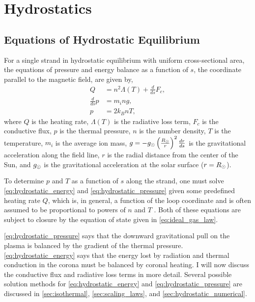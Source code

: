 \section{Hydrostatics}\label{sec:hydrostatic}

\subsection{Equations of Hydrostatic Equilibrium}\label{sec:hydrostatic_equations}

For a single strand in hydrostatic equilibrium with uniform cross-sectional area, the equations of pressure and energy balance as a function of $s$, the coordinate parallel to the magnetic field, are given by,
\begin{align}
    Q &= n^2\Lambda(T) + \frac{d}{ds}F_c, \label{eq:hydrostatic_energy} \\
    \frac{d}{ds}p &= m_ing, \label{eq:hydrostatic_pressure} \\
    p &= 2k_BnT, \label{eq:ideal_gas_law}
\end{align}
where $Q$ is the heating rate, $\Lambda(T)$ is the radiative loss term, $F_c$ is the conductive flux, $p$ is the thermal pressure, $n$ is the number density, $T$ is the temperature, $m_i$ is the average ion mass, $g=-g_\odot\left(\frac{R_\odot}{r}\right)^2\frac{dr}{ds}$ is the gravitational acceleration along the field line, $r$ is the radial distance from the center of the Sun, and $g_\odot$ is the gravitational acceleration at the solar surface ($r=R_\odot$).

To determine $p$ and $T$ as a function of $s$ along the strand, one must solve \autoref{eq:hydrostatic_energy} and \autoref{eq:hydrostatic_pressure} given some predefined heating rate $Q$, which is, in general, a function of the loop coordinate and is often assumed to be proportional to powers of $n$ and $T$ \citep{priest_magnetohydrodynamics_2014}. Both of these equations are subject to closure by the equation of state given in \autoref{eq:ideal_gas_law}.

\autoref{eq:hydrostatic_pressure} says that the downward gravitational pull on the plasma is balanced by the gradient of the thermal pressure. \autoref{eq:hydrostatic_energy} says that the energy lost by radiation and thermal conduction in the corona must be balanced by coronal heating. I will now discuss the conductive flux and radiative loss terms in more detail. Several possible solution methods for \autoref{eq:hydrostatic_energy} and \autoref{eq:hydrostatic_pressure} are discussed in \autoref{sec:isothermal}, \ref{sec:scaling_laws}, and \ref{sec:hydrostatic_numerical}.

